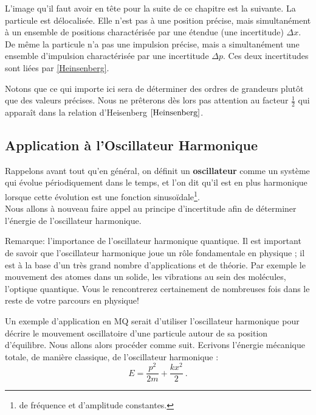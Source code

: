 \documentclass{book}
\newcommand\bg[2]{
\begin{center}
\fcolorbox{white}{BGgris}{\parbox{.9\linewidth}{\begin{large} \textit{#1} \end{large} \\
#2 }}
\end{center}}
\begin{document}
L'image qu'il faut avoir en tête pour la suite de ce chapitre est la suivante. La particule est délocalisée. Elle n'est pas à une position précise, mais simultanément à un ensemble de positions charactérisée par une étendue (une incertitude) $\Delta x$. De même la particule n'a pas une impulsion précise, mais a simultanément une ensemble d'impulsion charactérisée par une incertitude $\Delta p$. Ces deux incertitudes sont liées par \eqref{Heinsenberg}.


Notons  que ce qui importe ici sera de déterminer des ordres de grandeurs plutôt que des valeurs précises. Nous ne prêterons dès lors pas  attention au facteur $\frac{1}{2}$ qui apparaît dans la relation d'Heisenberg $\ref{Heinsenberg}$.




\subsection{Application à l'Oscillateur Harmonique }
\label{Application à l'Oscillateur Harmonique Quantique}

Rappelons avant tout qu'en général, on définit un \textbf{oscillateur} comme un système qui évolue périodiquement dans le temps, et l'on dit qu'il est en plus harmonique lorsque cette évolution est une fonction sinusoïdale\footnote{de fréquence et d'amplitude constantes.}. \\
Nous allons à nouveau faire appel au principe d'incertitude afin de déterminer l'énergie de l'oscillateur harmonique. 

Remarque: l'importance de l'oscillateur harmonique quantique.%
Il est important de savoir que l'oscillateur harmonique joue un rôle fondamentale en physique ; il est à la base d'un très grand nombre d'applications et de théorie.
Par exemple le mouvement des atomes dans un solide, les vibrations au sein des molécules, l'optique quantique. Vous le rencontrerez certainement de nombreuses fois dans le reste de votre parcours en physique!

Un  exemple d'application en MQ serait d'utiliser l'oscillateur harmonique pour décrire le mouvement oscillatoire d'une particule autour de sa position d'équilibre. Nous allons alors procéder comme suit. Ecrivons l'énergie mécanique totale, de manière classique, de l'oscillateur harmonique : 
\begin{equation}
    \label{Energie OHC}
    E = \frac{p^2}{2m} + \frac{kx^2}{2}\ .
\end{equation}
\end{document}

